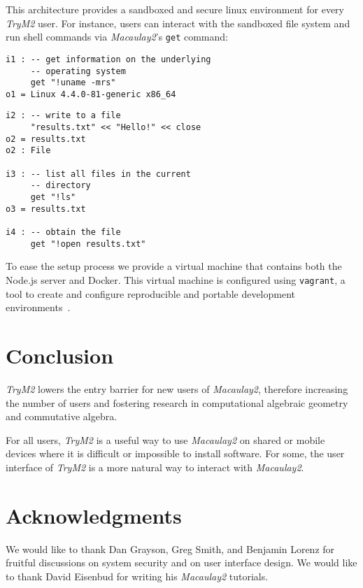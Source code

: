 \documentclass[twocolumn]{article}
\def\trym2{{\it TryM2}}
\def\M2{{\it Macaulay2}}
\begin{document}
This architecture provides a sandboxed and secure linux environment
for every \trym2 user.  For instance, users can interact with the
sandboxed file system and run shell commands via \M2's {\tt get}
command:

{\tiny\begin{verbatim}
i1 : -- get information on the underlying
     -- operating system
     get "!uname -mrs" 
o1 = Linux 4.4.0-81-generic x86_64
\end{verbatim}
}

{\tiny\begin{verbatim}
i2 : -- write to a file     
     "results.txt" << "Hello!" << close
o2 = results.txt
o2 : File

i3 : -- list all files in the current
     -- directory
     get "!ls"
o3 = results.txt

i4 : -- obtain the file
     get "!open results.txt"
\end{verbatim}
}


To ease the setup process we provide a virtual machine that contains both the Node.js server
and Docker. This virtual machine is configured using {\tt vagrant}, a tool to create and
configure reproducible and portable development environments~\cite{vagrant}.

\section{Conclusion}

\trym2 lowers the entry barrier for new users of \M2, therefore increasing the number 
 of users and fostering research in computational algebraic geometry and commutative algebra. 

For all users, \trym2 is a useful way to use \M2 on shared or mobile
devices where it is difficult or impossible to install software. For
some, the user interface of \trym2 is a more natural way to interact with \M2.

\section{Acknowledgments}

We would like to thank Dan Grayson, Greg Smith, and Benjamin Lorenz for
fruitful discussions on system security and on user interface design.
We would like to thank David Eisenbud for writing his \M2 tutorials.




\end{document}
